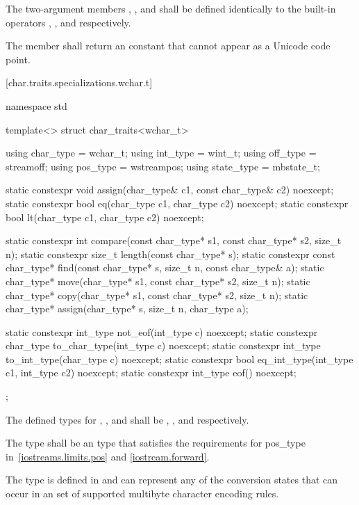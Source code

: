 \pnum
The two-argument members ,
, and  shall be defined identically to
the built-in operators \tcode{=}, \tcode{==}, and
\tcode{<} respectively.

\pnum
The member  shall return an
 constant that cannot appear as a Unicode
code point.

[char.traits.specializations.wchar.t]{}

%
\begin{codeblock}
namespace std {
  template<> struct char_traits<wchar_t> {
    using char_type  = wchar_t;
    using int_type   = wint_t;
    using off_type   = streamoff;
    using pos_type   = wstreampos;
    using state_type = mbstate_t;

    static constexpr void assign(char_type& c1, const char_type& c2) noexcept;
    static constexpr bool eq(char_type c1, char_type c2) noexcept;
    static constexpr bool lt(char_type c1, char_type c2) noexcept;

    static constexpr int compare(const char_type* s1, const char_type* s2, size_t n);
    static constexpr size_t length(const char_type* s);
    static constexpr const char_type* find(const char_type* s, size_t n,
                                           const char_type& a);
    static char_type* move(char_type* s1, const char_type* s2, size_t n);
    static char_type* copy(char_type* s1, const char_type* s2, size_t n);
    static char_type* assign(char_type* s, size_t n, char_type a);

    static constexpr int_type not_eof(int_type c) noexcept;
    static constexpr char_type to_char_type(int_type c) noexcept;
    static constexpr int_type to_int_type(char_type c) noexcept;
    static constexpr bool eq_int_type(int_type c1, int_type c2) noexcept;
    static constexpr int_type eof() noexcept;
  };
}
\end{codeblock}

\pnum
The defined types for
,
,
and
shall be
,
,
and
respectively.

\pnum
The type
shall be an  type that satisfies the requirements
for pos_type in~\ref{iostreams.limits.pos} and \ref{iostream.forward}.

\pnum
The type
is defined in
and can represent any of the conversion states that can occur in an  set of supported multibyte character encoding rules.

